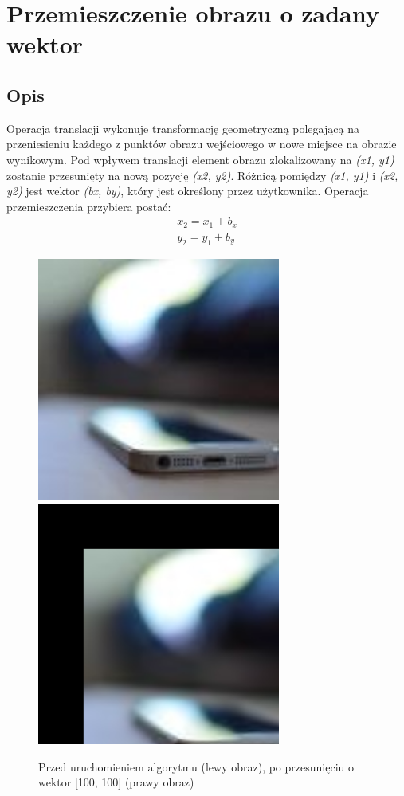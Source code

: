 \documentclass[a4paper,12pt]{book}
\begin{document}
\section{Przemieszczenie obrazu o zadany wektor}
\subsection*{Opis}
Operacja translacji wykonuje transformację geometryczną polegającą na przeniesieniu każdego z punktów obrazu wejściowego w nowe miejsce na obrazie wynikowym. Pod wpływem translacji element obrazu zlokalizowany na \textit{(x1, y1)} zostanie przesunięty na nową pozycję \textit{(x2, y2)}. Różnicą pomiędzy \textit{(x1, y1)} i \textit{(x2, y2)} jest wektor \textit{(bx, by)}, który jest określony przez użytkownika. 
\newline
Operacja przemieszczenia przybiera postać: 
\begin{gather}
	x_2 = x_1 + b_x \\
	y_2 = y_1 + b_y
\end{gather}
\begin{figure}[H]
	\caption{Przed uruchomieniem algorytmu (lewy obraz), po przesunięciu o wektor [100, 100] (prawy obraz)}
	\includegraphics[width=8cm, height=8cm]{phone-unmodified.jpg}
	\includegraphics[width=8cm, height=8cm]{phone-translate.png}
\end{figure}
\end{document}
